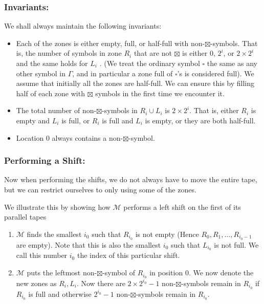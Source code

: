 \documentclass[a4paper, 11pt]{article}
\begin{document}
{		\subsubsection*{Invariants:}\parinf We shall always maintain the following invariants:
		\begin{itemize}
			\item Each of the zones is either empty, full, or half-full with non-$\boxtimes$-symbols. That is, the number of symbols in zone $R_i$ that are not $\boxtimes$ is either $0$, $2^i$, or $2\times  2^i$ and the same holds for $L_i$ . (We treat the ordinary symbol $\square$ the same as any other symbol in $\Gamma$, and in particular a zone full of $\square$’s is considered full). We assume that initially all the zones are half-full. We can ensure this by filling half of each zone with $\boxtimes$ symbols in the first time we encounter it.
			\item The total number of non-$\boxtimes$-symbols in $R_i \cup L_i$ is $2 \times 2^i$. That is, either $R_i$ is empty and $L_i$ is full, or $R_i$ is full and $L_i$ is empty, or they are both half-full.
			\item Location 0 always contains a non-$\boxtimes$-symbol.
		\end{itemize}
		
		
		
		\subsubsection*{Performing a Shift:}\parinf
		Now when performing the shifts, we do not always have to move the entire tape, but we can restrict ourselves to only using some of the zones.\parinn
		
		We illustrate this by showing how $\mathcal{M}$ performs a left shift on the first of its parallel tapes
		
		\begin{enumerate}
			\item $\mathcal{M}$ finds the smallest $i_0$ such that $R_{i_0}$ is not empty (Hence $R_0,R_1,\dots,R_{i_0-1}$ are empty). Note that this is also the smallest $i_0$ such that $L_{i_0}$ is not full. We call this number $i_0$ the index of this particular shift.
			\item $\mathcal{M}$ puts the leftmost non-$\boxtimes$-symbol of $R_{i_0}$ in position 0. We now denote the new zones as $R_i, L_i$. Now there are $2\times 2^{i_0}-1$ non-$\boxtimes$-symbols remain in $R_{i_0}$ if $R_{i_0}$ is full and otherwise $2^{i_0}-1$ non-$\boxtimes$-symbols remain in $R_{i_0}$. \parinn
			

\end{enumerate}}
\end{document}
